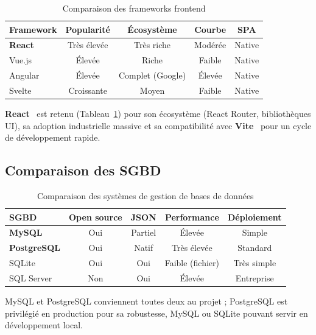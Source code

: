 \begin{table}[H]
\centering
\small
\caption{Comparaison des frameworks frontend}
\label{tab:frontend_benchmark}
\begin{tabular}{|l|c|c|c|c|}
\hline
\textbf{Framework} & \textbf{Popularité} & \textbf{Écosystème} & \textbf{Courbe} &
\textbf{SPA} \\
\hline
\textbf{React} & Très élevée & Très riche & Modérée & Native \\
\hline
Vue.js & Élevée & Riche & Faible & Native \\
\hline
Angular & Élevée & Complet (Google) & Élevée & Native \\
\hline
Svelte & Croissante & Moyen & Faible & Native \\
\hline
\end{tabular}
\end{table}

\textbf{React}~\cite{react} est retenu (Tableau~\ref{tab:frontend_benchmark}) pour son
écosystème (React Router, bibliothèques UI), sa adoption industrielle massive et sa
compatibilité avec \textbf{Vite}~\cite{vite} pour un cycle de développement rapide.

\subsection{Comparaison des SGBD}

\begin{table}[H]
\centering
\small
\caption{Comparaison des systèmes de gestion de bases de données}
\label{tab:db_benchmark}
\begin{tabular}{|l|c|c|c|c|}
\hline
\textbf{SGBD} & \textbf{Open source} & \textbf{JSON} & \textbf{Performance} &
\textbf{Déploiement} \\
\hline
\textbf{MySQL} & Oui & Partiel & Élevée & Simple \\
\hline
\textbf{PostgreSQL} & Oui & Natif & Très élevée & Standard \\
\hline
SQLite & Oui & Oui & Faible (fichier) & Très simple \\
\hline
SQL Server & Non & Oui & Élevée & Entreprise \\
\hline
\end{tabular}
\end{table}

MySQL et PostgreSQL conviennent toutes deux au projet ; PostgreSQL est privilégié en
production pour sa robustesse, MySQL ou SQLite pouvant servir en développement local.

